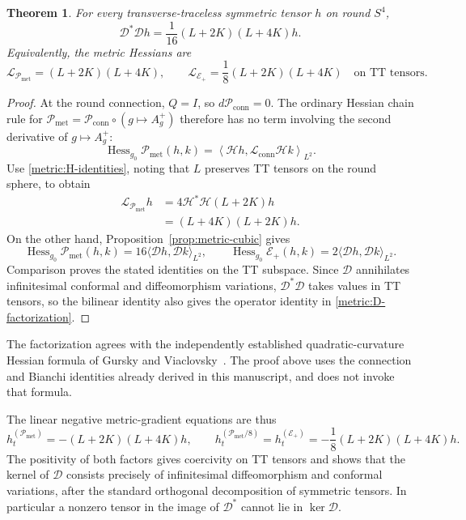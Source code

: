\documentclass[11pt]{article}
\numberwithin{equation}{section}
\newtheorem{theorem}{Theorem}[section]
\theoremstyle{definition}
\theoremstyle{remark}
\begin{document}
\begin{theorem}\label{thm:metric-Hessian-factorization}
For every transverse-traceless symmetric tensor $h$ on round $S^4$,
\begin{equation}\label{metric:D-factorization}
 \mathcal D^*\mathcal D h
 =\frac1{16}(L+2K)(L+4K)h.
\end{equation}
Equivalently, the metric Hessians are
\begin{equation}\label{metric:Hessian-pair}
 \mathcal L_{\mathcal P_{\mathrm{met}}}
 =(L+2K)(L+4K),\qquad
 \mathcal L_{\mathcal E_+}
 =\frac18(L+2K)(L+4K)
 \quad\text{on TT tensors}.
\end{equation}
\end{theorem}

\begin{proof}
At the round connection, $Q=I$, so
$d\mathcal P_{\mathrm{conn}}=0$. The ordinary Hessian chain rule for
$\mathcal P_{\mathrm{met}}=\mathcal P_{\mathrm{conn}}\circ(g\mapsto A_g^+)$
therefore has no term involving the second derivative of $g\mapsto A_g^+$:
\[
 \operatorname{Hess}_{g_0}\mathcal P_{\mathrm{met}}(h,k)
 =\left\langle\mathcal Hh,
 \mathcal L_{\mathrm{conn}}\mathcal Hk\right\rangle_{L^2}.
\]
Use \eqref{metric:H-identities}, noting that $L$ preserves TT tensors on
the round sphere, to obtain
\begin{align*}
 \mathcal L_{\mathcal P_{\mathrm{met}}}h
 &=4\mathcal H^*\mathcal H(L+2K)h\\
 &=(L+4K)(L+2K)h.
\end{align*}
On the other hand, Proposition~\ref{prop:metric-cubic} gives
\[
 \operatorname{Hess}_{g_0}\mathcal P_{\mathrm{met}}(h,k)
 =16\langle\mathcal Dh,\mathcal Dk\rangle_{L^2},
 \qquad
 \operatorname{Hess}_{g_0}\mathcal E_+(h,k)
 =2\langle\mathcal Dh,\mathcal Dk\rangle_{L^2}.
\]
Comparison proves the stated identities on the TT subspace. Since
$\mathcal D$ annihilates infinitesimal conformal and diffeomorphism
variations, $\mathcal D^*\mathcal D$ takes values in TT tensors, so the
bilinear identity also gives the operator identity in
\eqref{metric:D-factorization}.
\end{proof}

The factorization agrees with the independently established
quadratic-curvature Hessian formula of
Gursky and Viaclovsky~\cite{GurskyViaclovsky2015}.
The proof above uses the connection and Bianchi identities already
derived in this manuscript, and does not invoke that formula.

The linear negative metric-gradient equations are thus
\begin{equation}\label{metric:linear-flows}
 h_t^{(\mathcal P_{\mathrm{met}})}=-(L+2K)(L+4K)h,
 \qquad
 h_t^{(\mathcal P_{\mathrm{met}}/8)}
 =h_t^{(\mathcal E_+)}=-\frac18(L+2K)(L+4K)h.
\end{equation}
The positivity of both factors gives coercivity on TT tensors and shows
that the kernel of $\mathcal D$ consists precisely of infinitesimal
diffeomorphism and conformal variations, after the standard orthogonal
decomposition of symmetric tensors. In particular a nonzero tensor in
the image of $\mathcal D^*$ cannot lie in $\ker\mathcal D$.
\end{document}
